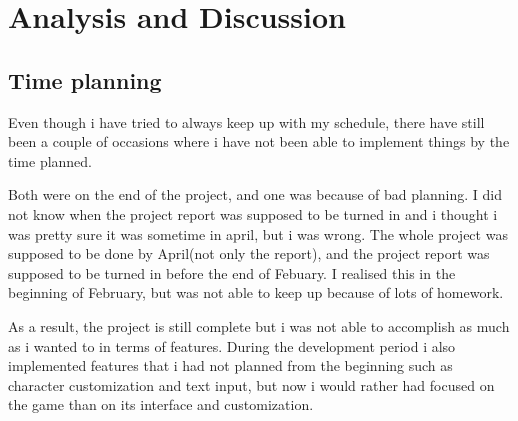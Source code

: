 \documentclass[a4paper,12pt]{article}
\begin{document}
\clearpage

\section{Analysis and Discussion}

\subsection{Time planning}

Even though i have tried to always keep up with my schedule, there have still been a couple of occasions where i have not been able to implement things by the time planned.

Both were on the end of the project, and one was because of bad planning.
I did not know when the project report was supposed to be turned in and i thought i was pretty sure it was sometime in april, but i was wrong. 
The whole project was supposed to be done by April(not only the report), and the project report was supposed to be turned in before the end of Febuary. I realised this in the beginning of February, but was not able to keep up because of lots of homework.

As a result, the project is still complete but i was not able to accomplish as much as i wanted to in terms of features.
During the development period i also implemented features that i had not planned from the beginning such as character customization and text input, but now i would rather had focused on the game than on its interface and customization.
\\
\end{document}
